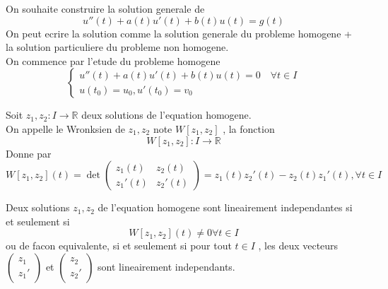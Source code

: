 \documentclass[../main.tex]{subfiles}
\begin{document}
On souhaite construire la solution generale de
\[ 
	u''( t) + a( t) u'( t) + b( t) u( t) = g( t) 
\]
On peut ecrire la solution comme la solution generale du probleme homogene + la solution particuliere du probleme non homogene.\\
On commence par l'etude du probleme homogene
\[ 
	\begin{cases}
	u''( t) + a( t) u'( t) + b( t) u( t) =0\quad \forall t \in I\\
	u( t_0) =u_0 , u'( t_0) = v_0
	\end{cases}
\]
\begin{defn}
Soit $z_1, z_2: I\to \mathbb{R}$ deux solutions de l'equation homogene.\\
On appelle le Wronksien de $z_1, z_2$ note $W [ z_1,z_2] $ , la fonction
\[ 
	W[z_1,z_2] : I\to \mathbb{R}
\]
Donne par
\[ 
	W[z_1,z_2]( t) = \det \begin{pmatrix}
		z_1( t) & z_2( t) \\
		z_1'( t) & z_2'( t) 
	\end{pmatrix}  = z_1( t) z_2'( t) - z_2( t) z_1'( t) , \forall t \in I
\]


\end{defn}
\begin{thm}
Deux solutions $z_1,z_2$ de l'equation homogene sont lineairement independantes si et seulement si 
\[ 
	W[z_1,z_2] ( t) \neq 0 \forall t \in I
\]
ou de facon equivalente, si et seulement si pour tout $t\in I$ , les deux vecteurs $ \begin{pmatrix}
z_1\\z_1'
\end{pmatrix} $ et $ \begin{pmatrix}
z_2\\z_2'
\end{pmatrix} $ sont lineairement independants.
\end{thm}
\end{document}
